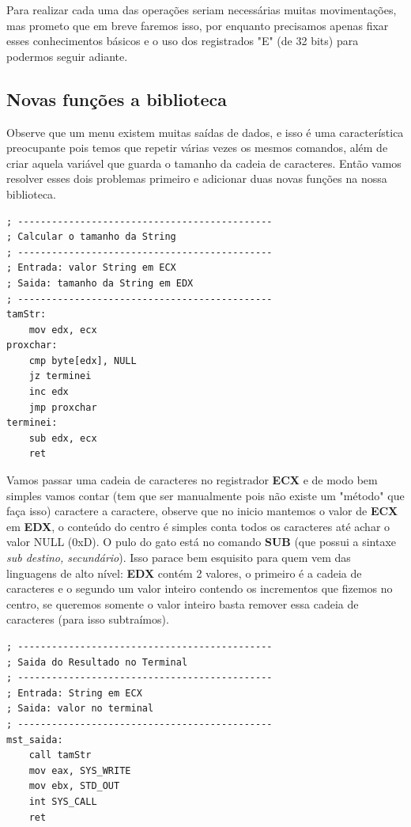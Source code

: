 Para realizar cada uma das operações seriam necessárias muitas movimentações, mas prometo que em breve faremos isso, por enquanto precisamos apenas fixar esses conhecimentos básicos e o uso dos registrados "E" (de 32 bits) para podermos seguir adiante.

\subsection{Novas funções a biblioteca}
Observe que um menu existem muitas saídas de dados, e isso é uma característica preocupante pois temos que repetir várias vezes os mesmos comandos, além de criar aquela variável que guarda o tamanho da cadeia de caracteres. Então vamos resolver esses dois problemas primeiro e adicionar duas novas funções na nossa biblioteca.

\begin{lstlisting}[]
; ---------------------------------------------
; Calcular o tamanho da String
; ---------------------------------------------
; Entrada: valor String em ECX
; Saida: tamanho da String em EDX
; ---------------------------------------------
tamStr:  
	mov edx, ecx
proxchar:
	cmp byte[edx], NULL
	jz terminei
	inc edx
	jmp proxchar  
terminei:
	sub edx, ecx
	ret
\end{lstlisting}

Vamos passar uma cadeia de caracteres no registrador \textbf{ECX} e de modo bem simples vamos contar (tem que ser manualmente pois não existe um "método" que faça isso) caractere a caractere, observe que no inicio mantemos o valor de \textbf{ECX} em \textbf{EDX}, o conteúdo do centro é simples conta todos os caracteres até achar o valor NULL (0xD). O pulo do gato está no comando \textbf{SUB} (que possui a sintaxe \textit{sub destino, secundário}). Isso parace bem esquisito para quem vem das linguagens de alto nível: \textbf{EDX} contém 2 valores, o primeiro é a cadeia de caracteres e o segundo um valor inteiro contendo os incrementos que fizemos no centro, se queremos somente o valor inteiro basta remover essa cadeia de caracteres (para isso subtraímos).

\begin{lstlisting}[]
; ---------------------------------------------
; Saida do Resultado no Terminal
; ---------------------------------------------
; Entrada: String em ECX
; Saida: valor no terminal
; ---------------------------------------------
mst_saida:
	call tamStr
	mov eax, SYS_WRITE
	mov ebx, STD_OUT
	int SYS_CALL
	ret
\end{lstlisting}

